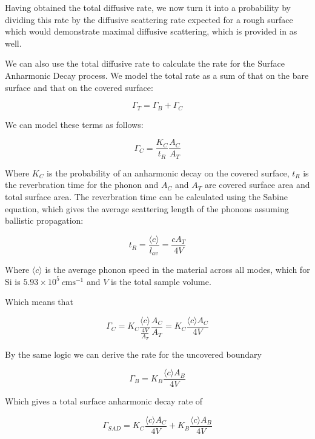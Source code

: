 \documentclass[11pt]{article}
\begin{document}
Having obtained the total diffusive rate, we now turn it into a probability by dividing this rate by the diffusive scattering rate expected
for a rough surface which would demonstrate maximal diffusive scattering, which is provided in \cite{4} as well. 

We can also use the total diffusive rate to calculate the rate for the Surface Anharmonic Decay process. We model the total
rate as a sum of that on the bare surface and that on the covered surface:

\begin{equation}
\Gamma_T = \Gamma_B + \Gamma_C 
\end{equation}

We can model these terms as follows:

\begin{equation}
\Gamma_C = \frac{K_C}{t_R}\frac{A_C}{A_T}
\end{equation}

Where $K_C$ is the probability of an anharmonic decay on the covered surface, $t_R$ is the reverbration time for the phonon and $A_C$ and $A_T$
are covered surface area and total surface area. The reverbration time can be calculated using the Sabine equation, which gives the average scattering
length of the phonons assuming ballistic propagation:

\begin{equation}
t_R = \frac{\langle c \rangle}{l_{av}} = \frac{c A_T}{4V}
\end{equation}

Where $\langle c \rangle$ is the average phonon speed in the material across all modes, which for Si is $5.93 \times 10^{5} \ \si{c\meter
\second^{-1}}$ \cite{4} 
and $V$ is the total sample volume.

Which means that 

\begin{equation}
\Gamma_C = K_C \frac{\langle c \rangle}{\frac{4V}{A_T}}\frac{A_C}{A_T} = K_C \frac{\langle c \rangle A_C}{4V}
\end{equation}
 
 By the same logic we can derive the rate for the uncovered boundary
 
 \begin{equation}
 \Gamma_B = K_B \frac{\langle c \rangle A_B}{4V}
 \end{equation}
 
 Which gives a total surface anharmonic decay rate of 
 
 \begin{equation}
 \Gamma_{SAD} = K_C \frac{\langle c \rangle A_C}{4V} + K_B \frac{\langle c \rangle A_B}{4V}
 \end{equation}
 
\end{document}
